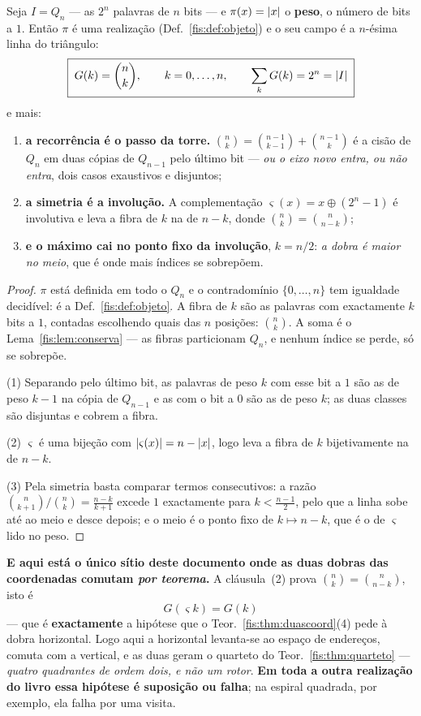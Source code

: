 \documentclass[livro.tex]{subfiles}
\begin{document}
\begin{teorema}\label{fis:thm:pascal}
Seja $I=Q_n$ --- as $2^{n}$ palavras de $n$ bits --- e $\pi(x)=\lvert x\rvert$ o
\textbf{peso}, o número de bits a $1$. Então $\pi$ é uma realização
(Def.~\ref{fis:def:objeto}) e o seu campo é a $n$-ésima linha do triângulo:
\[
\boxed{\;G(k)=\binom{n}{k},\qquad k=0,\dots,n,
\qquad \sum_{k}G(k)=2^{n}=\lvert I\rvert\;}
\]
e mais:
\begin{enumerate}\itemsep3pt
\item[(1)] \textbf{a recorrência é o passo da torre.}
$\binom{n}{k}=\binom{n-1}{k-1}+\binom{n-1}{k}$ é a cisão de $Q_n$ em duas cópias
de $Q_{n-1}$ pelo último bit --- \emph{ou o eixo novo entra, ou não entra}, dois
casos exaustivos e disjuntos;
\item[(2)] \textbf{a simetria é a involução.} A complementação
$\varsigma(x)=x\oplus(2^{n}-1)$ é involutiva e leva a fibra de $k$ na de $n-k$,
donde $\binom{n}{k}=\binom{n}{n-k}$;
\item[(3)] \textbf{e o máximo cai no ponto fixo da involução}, $k=n/2$: \emph{a
dobra é maior no meio}, que é onde mais índices se sobrepõem.
\end{enumerate}
\end{teorema}

\begin{proof}
$\pi$ está definida em todo o $Q_n$ e o contradomínio $\{0,\dots,n\}$ tem
igualdade decidível: é a Def.~\ref{fis:def:objeto}. A fibra de $k$ são as
palavras com exactamente $k$ bits a $1$, contadas escolhendo quais das $n$
posições: $\binom{n}{k}$. A soma é o Lema~\ref{fis:lem:conserva} --- as fibras
particionam $Q_n$, e nenhum índice se perde, só se sobrepõe.

(1) Separando pelo último bit, as palavras de peso $k$ com esse bit a $1$ são as
de peso $k-1$ na cópia de $Q_{n-1}$ e as com o bit a $0$ são as de peso $k$; as
duas classes são disjuntas e cobrem a fibra.

(2) $\varsigma$ é uma bijeção com $\lvert \varsigma(x)\rvert=n-\lvert x\rvert$, logo leva a
fibra de $k$ bijetivamente na de $n-k$.

(3) Pela simetria basta comparar termos consecutivos: a razão
$\binom{n}{k+1}\big/\binom{n}{k}=\tfrac{n-k}{k+1}$ excede $1$ exactamente para
$k<\tfrac{n-1}{2}$, pelo que a linha sobe até ao meio e desce depois; e o meio é
o ponto fixo de $k\mapsto n-k$, que é o de $\varsigma$ lido no peso.
\end{proof}

\medskip\noindent\textbf{E aqui está o único sítio deste documento onde as duas
dobras das coordenadas comutam \emph{por teorema}.} A cláusula~(2) prova
$\binom{n}{k}=\binom{n}{n-k}$, isto é
\[
\boxed{\;G(\varsigma k)=G(k)\;}
\]
--- que é \textbf{exactamente} a hipótese que o
Teor.~\ref{fis:thm:duascoord}(4) pede à dobra horizontal. Logo aqui a horizontal
levanta-se ao espaço de endereços, comuta com a vertical, e as duas geram o
quarteto do Teor.~\ref{fis:thm:quarteto} --- \emph{quatro quadrantes de ordem
dois, e não um rotor}. \textbf{Em toda a outra realização do livro essa hipótese
é suposição ou falha}; na espiral quadrada, por exemplo, ela falha por uma
visita.
\end{document}
